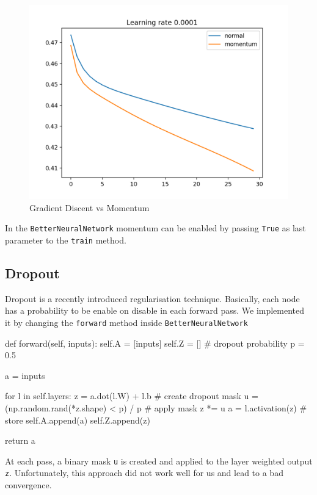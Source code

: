 \documentclass[11pt]{article}
\begin{document}
\begin{figure}[H]
\includegraphics[scale=0.35]{images/momentum_plot_0,0001.png}	
\caption{Gradient Discent vs Momentum}
\end{figure}
In the \texttt{BetterNeuralNetwork} momentum can be enabled by passing \texttt{True} as last parameter to the \texttt{train} method.
\subsection{Dropout}
Dropout is a recently introduced regularisation technique. Basically, each node has a probability to be enable on disable in each forward pass. We implemented it by changing the \texttt{forward} method inside \texttt{BetterNeuralNetwork}
\begin{python}
    def forward(self, inputs):
        self.A = [inputs]
        self.Z = []
        # dropout probability
        p = 0.5
        
        a = inputs

        for l in self.layers:
            z = a.dot(l.W) + l.b
            # create dropout mask
            u = (np.random.rand(*z.shape) < p) / p
            # apply mask
            z *= u
            a = l.activation(z)
            # store
            self.A.append(a)
            self.Z.append(z)

        return a
\end{python}
At each pass, a binary mask \texttt{u} is created and applied to the layer weighted output \texttt{z}. Unfortunately, this approach did not work well for us and lead to a bad convergence.
\end{document}
